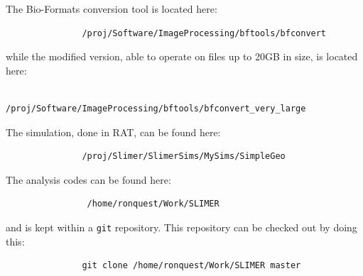 \documentclass[11pt]{article}
\begin{document}
The Bio-Formats conversion tool is located here:
\begin{verbatim}
               /proj/Software/ImageProcessing/bftools/bfconvert
\end{verbatim}
while the modified version, able to operate on files up to 20GB in size, is located here:
\begin{verbatim}
               /proj/Software/ImageProcessing/bftools/bfconvert_very_large
\end{verbatim}

The simulation, done in RAT, can be found here:
\begin{verbatim}
               /proj/Slimer/SlimerSims/MySims/SimpleGeo
\end{verbatim}

The analysis codes can be found here:
\begin{verbatim}
                /home/ronquest/Work/SLIMER
\end{verbatim}
and is kept within a \verb+git+ repository. This repository can be checked out by doing this:
\begin{verbatim}
               git clone /home/ronquest/Work/SLIMER master
\end{verbatim}
\end{document}
